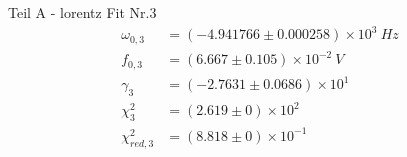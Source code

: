 {\LARGE Teil A - lorentz Fit Nr.3}
\begin{align*}
	\omega_{0,3} &= \left(-4.941766 \pm 0.000258\right) \times 10^{3}\ Hz\\
	f_{0,3} &= \left(6.667 \pm 0.105\right) \times 10^{-2}\ V\\
	\gamma_3 &= \left(-2.7631 \pm 0.0686\right) \times 10^{1}\ \\
	\chi^2_{3} &= \left(2.619 \pm 0\right) \times 10^{2}\ \\
	\chi^2_{red,3} &= \left(8.818 \pm 0\right) \times 10^{-1}\ \\
\end{align*}